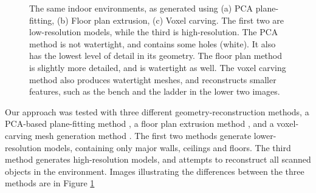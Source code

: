 \documentclass[]{spie}  %
\begin{document}
\begin{figure}
    
  \caption{The same indoor environments, as generated using (a) PCA
    plane-fitting, (b) Floor plan extrusion, (c) Voxel carving. The
    first two are low-resolution models, while the third is
    high-resolution. The PCA method is not watertight, and contains
    some holes (white). It also has the lowest level of detail in its
    geometry. The floor plan method is slightly more detailed, and is
    watertight as well. The voxel carving method also produces
    watertight meshes, and reconstructs smaller features, such as the
    bench and the ladder in the lower two images.}
  \label{fig:modelcomparisons}
\end{figure}

Our approach was tested with three different geometry-reconstruction
methods, a PCA-based plane-fitting method \cite{sanchez2012point}, a
floor plan extrusion method \cite{turnerfloorplan}, and a
voxel-carving mesh generation method \cite{turnerwatertight}. The
first two methods generate lower-resolution models, containing only
major walls, ceilings and floors. The third method generates
high-resolution models, and attempts to reconstruct all scanned
objects in the environment. Images illustrating the differences
between the three methods are in Figure \ref{fig:modelcomparisons}
\end{document}
